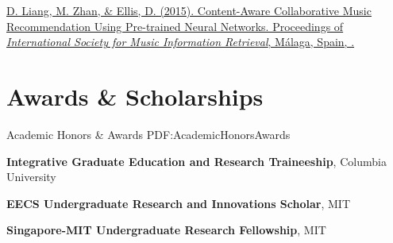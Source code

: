 \documentclass[a4paper,10pt,oneside]{article}
\begin{document}
\begin{body}
\href{http://ismir2015.uma.es/articles/290_Paper.pdf}
{D. Liang, \underline{M. Zhan}, \& Ellis, D. (2015).
Content-Aware Collaborative Music Recommendation Using Pre-trained Neural Networks. Proceedings of \textit{International Society for Music Information Retrieval},
Málaga, Spain, 
.}


\section
{Awards \& \newline Scholarships}
{Academic Honors \& Awards}
{PDF:AcademicHonorsAwards}

\textbf{Integrative Graduate Education and Research Traineeship}, Columbia University
\hfill
{} 

\SmallEntryGap

\textbf{EECS Undergraduate Research and Innovations Scholar}, MIT
\hfill
{}

\SmallEntryGap

\textbf{Singapore-MIT Undergraduate Research Fellowship}, MIT
\hfill
{}


%
%




%


\end{body}
\end{document}
